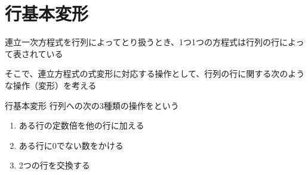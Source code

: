 \documentclass[../../../topic_linear-algebra]{subfiles}
\begin{document}
\sectionline
\section{行基本変形}

連立一次方程式を行列によってとり扱うとき、1つ1つの方程式は行列の行によって表されている

そこで、連立方程式の式変形に対応する操作として、行列の行に関する次のような操作（変形）を考える

\begin{definition*}{行基本変形}
  行列への次の3種類の操作をという
  \begin{enumerate}[label=\romanlabel]
    \item ある行の定数倍を他の行に加える
    \item ある行に0でない数をかける
    \item 2つの行を交換する
  \end{enumerate}
\end{definition*}
\end{document}
